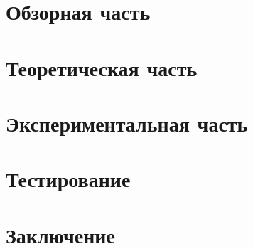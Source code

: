 \chapter{Обзорная часть}
	


\chapter{Теоретическая часть}
	
	
\chapter{Экспериментальная часть}
	
	
\chapter{Тестирование}
	

\chapter*{Заключение}
	
